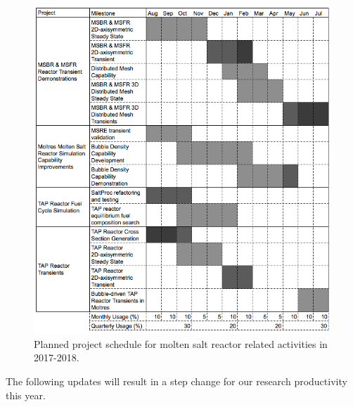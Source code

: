 \documentclass[letterpaper]{article}
\begin{document}
\begin{figure}[htbp!]
\begin{center}
        \includegraphics[width=\textwidth]{proj.png}
\end{center}
\caption{Planned project schedule for molten salt reactor related activities in 2017-2018.}
\label{fig:proj}
\end{figure}

The following updates will result in a step change for our research 
productivity this year. 
\end{document}
